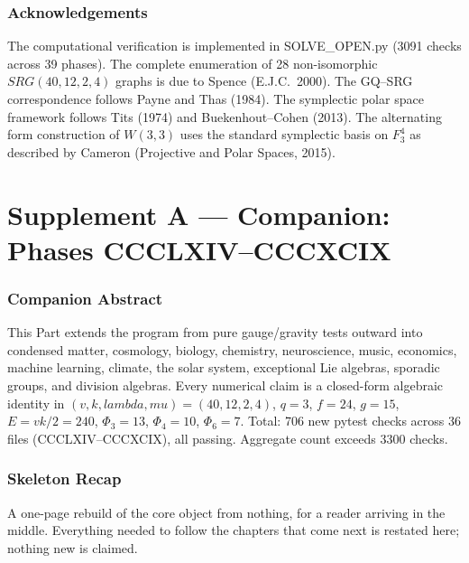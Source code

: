 \documentclass[12pt,a4paper]{article}
\def\mathbb#1{#1}%
\def\mathrm#1{#1}%
\def\textbf#1{#1}%
\def\texttt#1{#1}%
\def\lambda{lambda}%
\def\mu{mu}%
\def\Phi#1{Phi#1}%
\theoremstyle{definition}
\newcommand{\SRG}{\mathrm{SRG}}
\newcommand{\FF}{\mathbb{F}}
\begin{document}
\section*{Acknowledgements}

The computational verification is implemented in \texttt{SOLVE\_OPEN.py}
(3091 checks across 39 phases).
The complete enumeration of 28 non-isomorphic $\SRG(40,12,2,4)$ graphs
is due to Spence (E.J.C.\ 2000).
The GQ--SRG correspondence follows Payne and Thas (1984).
The symplectic polar space framework follows Tits (1974) and
Buekenhout--Cohen (2013).
The alternating form construction of $W(3,3)$ uses the standard
symplectic basis on $\FF_3^4$ as described by
Cameron (Projective and Polar Spaces, 2015).

\clearpage
\part*{Supplement A --- Companion: Phases CCCLXIV--CCCXCIX}

\section{Companion Abstract}
This Part extends the program from pure gauge/gravity tests outward into
condensed matter, cosmology, biology, chemistry, neuroscience, music,
economics, machine learning, climate, the solar system, exceptional Lie
algebras, sporadic groups, and division algebras. Every numerical claim
is a closed-form algebraic identity in
$(v,k,\lambda,\mu)=(40,12,2,4)$, $q=3$, $f=24$, $g=15$,
$E=vk/2=240$, $\Phi_3=13$, $\Phi_4=10$, $\Phi_6=7$.
Total: \textbf{706 new pytest checks across 36 files} (CCCLXIV--CCCXCIX),
all passing. Aggregate count exceeds 3300 checks.

\section{Skeleton Recap}

\begin{plainbox}
A one-page rebuild of the core object from nothing, for a reader arriving in the
middle. Everything needed to follow the chapters that come next is restated here; nothing
new is claimed.
\end{plainbox}
\end{document}
